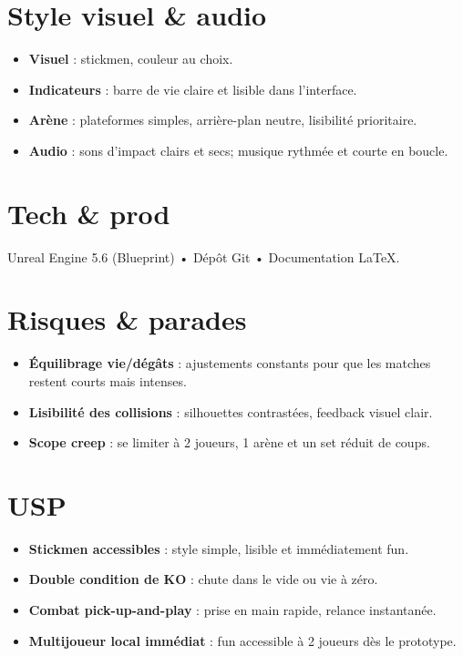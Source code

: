 \documentclass[10.8pt,letterpaper]{article}
\begin{document}
\begin{multicols}{2}
\section*{Style visuel \& audio}
\begin{itemize}
  \item \textbf{Visuel} : stickmen, couleur au choix.
  \item \textbf{Indicateurs} : barre de vie claire et lisible dans l'interface.
  \item \textbf{Arène} : plateformes simples, arrière-plan neutre, lisibilité prioritaire.
  \item \textbf{Audio} : sons d’impact clairs et secs; musique rythmée et courte en boucle.
\end{itemize}

\section*{Tech \& prod}
Unreal Engine 5.6 (Blueprint) • Dépôt Git • Documentation \LaTeX{}.

\section*{Risques \& parades}
\begin{itemize}
  \item \textbf{Équilibrage vie/dégâts} : ajustements constants pour que les matches restent courts mais intenses.
  \item \textbf{Lisibilité des collisions} : silhouettes contrastées, feedback visuel clair.
  \item \textbf{Scope creep} : se limiter à 2 joueurs, 1 arène et un set réduit de coups.
\end{itemize}

\section*{USP}
\begin{itemize}
  \item \textbf{Stickmen accessibles} : style simple, lisible et immédiatement fun.
  \item \textbf{Double condition de KO} : chute dans le vide ou vie à zéro.
  \item \textbf{Combat pick-up-and-play} : prise en main rapide, relance instantanée.
  \item \textbf{Multijoueur local immédiat} : fun accessible à 2 joueurs dès le prototype.
\end{itemize}

\end{multicols}
\end{document}
